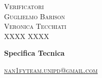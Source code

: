 \documentclass[8pt]{article}
\begin{document}
\begin{titlepage}
\begin{minipage}[t]{0.47\textwidth}
		{\large{\textsc{Verificatori}}
			\vspace{3mm}
			{\\\large{\textsc{Guglielmo Barison}\\}} 
			{\large{\textsc{Veronica Tecchiati}\\}} 
			{\large{\textsc{XXXX XXXX}\\}}
			
		}
		\vspace{2mm}\vspace{2mm}
	\end{minipage}
	\vspace{4cm}
	\begin{center}
		\begin{flushright}
			{\fontsize{30pt}{52pt}\selectfont \textbf{Specifica Tecnica}} %
		\end{flushright}
		\vspace{3cm}
	\end{center}
	\vspace{10 cm}
	{\small \textsc{\href{mailto: nan1fyteam.unipd@gmail.com}{nan1fyteam.unipd@gmail.com}}}
\end{titlepage}
\pagestyle{mystyle}
\end{document}

